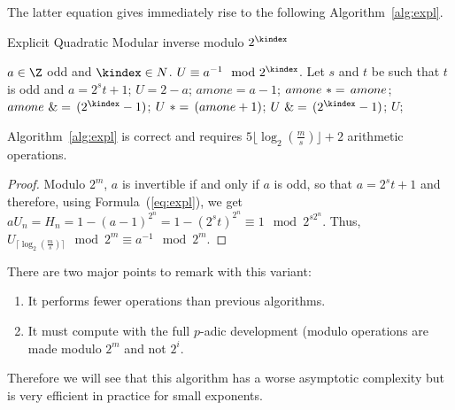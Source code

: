 The latter equation gives immediately rise to the following Algorithm~\ref{alg:expl}. 

\begin{algorithm}[htbp]
\caption{Explicit Quadratic Modular inverse modulo $2^\kindex$}
\label{alg:expl}
\begin{algorithmic}[1]
\REQUIRE $a \in \Z$ odd and $\kindex \in N$.
\ENSURE $U \equiv a^{-1} \mod 2^\kindex$.
\STATE Let $s$ and $t$ be such that $t$ is odd and $a=2^st+1$;
\STATE $U=2-a$;
\STATE $amone = a-1$;
\STATE $amone ~*=\, amone$; \hfill{}
\STATE $amone \LOGANDIN (2^\kindex-1)$;\hfill{}
\STATE $U ~*=\, (amone+1)$; 
\STATE $U \LOGANDIN (2^\kindex-1)$;\hfill{}
\ENDFOR
\RETURN $U$;
\end{algorithmic}
\end{algorithm}

\begin{lemma} Algorithm~\ref{alg:expl} is correct and 
requires $5 \lfloor\log_2(\frac{m}{s})\rfloor + 2$ arithmetic operations.
\end{lemma}
\begin{proof}
Modulo $2^m$, $a$ is invertible if and only if $a$ is odd, so that
$a=2^st+1$ and therefore, using Formula~(\ref{eq:expl}), we get
$a U_n = H_n = 1-(a-1)^{2^n}=1-(2^st)^{2^n} \equiv 1 \mod 2^{s2^n}.$
Thus,
$U_{\lceil\log_2(\frac{m}{s})\rceil} \mod 2^m \equiv a^{-1} \mod 2^m.$
\end{proof}

There are two major points to remark with this variant:
\begin{enumerate}
\item It performs fewer operations than previous algorithms.
\item It must compute with the full $p$-adic development (modulo operations are
  made modulo $2^m$ and not $2^i$.
\end{enumerate}
Therefore we will see that this algorithm has a worse asymptotic complexity
but is very efficient in practice for small exponents.

